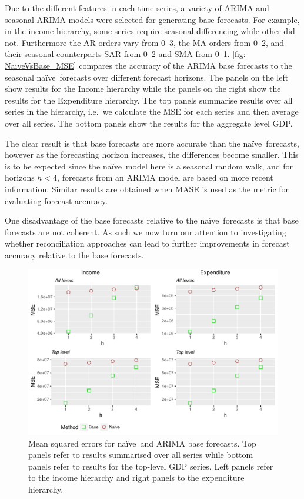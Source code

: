 \documentclass[graybox]{svmult}
\def\naive{na\"{i}ve\ }
\begin{document}
Due to the different features in each time series, a variety of ARIMA and seasonal ARIMA models were selected for generating base forecasts. For example, in the income hierarchy, some series require seasonal differencing while other did not. Furthermore the AR orders vary from 0--3, the MA orders from 0--2, and their seasonal counterparts SAR from 0--2 and SMA from 0--1. \autoref{fig: NaiveVsBase_MSE} compares the accuracy of the ARIMA base forecasts to the seasonal \naive forecasts over different forecast horizons. The panels on the left show results for the Income hierarchy while the panels on the right show the results for the Expenditure hierarchy. The top panels summarise results over all series in the hierarchy, i.e.\ we calculate the MSE for each series and then average over all series. The bottom panels show the results for the aggregate level GDP.

The clear result is that base forecasts are more accurate than the \naive forecasts, however as the forecasting horizon increases, the differences become smaller. This is to be expected since the \naive model here is a seasonal random walk, and for horizons $h<4$, forecasts from an ARIMA model are based on more recent information. Similar results are obtained when MASE is used as the metric for evaluating forecast accuracy.

One disadvantage of the base forecasts relative to the \naive forecasts is that base forecasts are not coherent. As such we now turn our attention to investigating whether reconciliation approaches can lead to further improvements in forecast accuracy relative to the base forecasts.

\begin{figure}
	\centering
	\small
	\includegraphics[width=\textwidth]{Figs/Results/NaiveVsBase_MSE.pdf}
	\caption{Mean squared errors for \naive and ARIMA base forecasts. Top panels refer to results summarised over all series while bottom panels refer to results for the top-level GDP series. Left panels refer to the income hierarchy and right panels to the expenditure hierarchy.}\label{fig: NaiveVsBase_MSE}
\end{figure}
\end{document}
